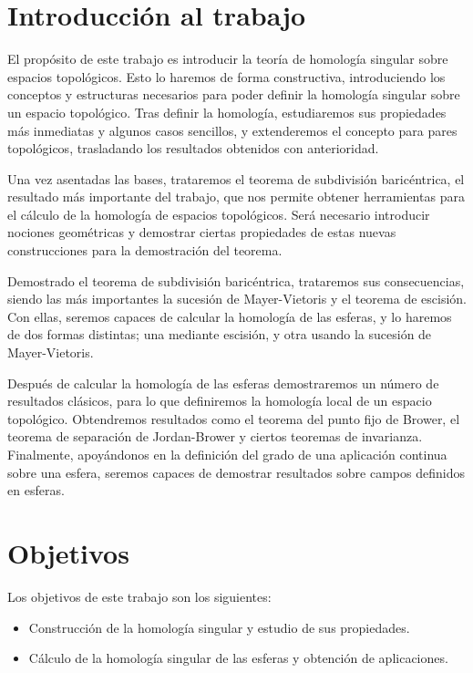 \label{ch:introduccionHOM}

\section{Introducción al trabajo}

El propósito de este trabajo es introducir la teoría de homología singular sobre
espacios topológicos. Esto lo haremos de forma constructiva, introduciendo los conceptos
y estructuras necesarios para poder definir la homología singular sobre un espacio topológico.
Tras definir la homología, estudiaremos sus propiedades más inmediatas y algunos casos sencillos,
y extenderemos el concepto para pares topológicos, trasladando los resultados obtenidos
con anterioridad.

Una vez asentadas las bases, trataremos el teorema de subdivisión baricéntrica, el
resultado más importante del trabajo, que nos permite obtener herramientas para el
cálculo de la homología de espacios topológicos. Será necesario introducir nociones
geométricas y demostrar ciertas propiedades de estas nuevas construcciones para la
demostración del teorema.

Demostrado el teorema de subdivisión baricéntrica, trataremos sus consecuencias,
siendo las más importantes la sucesión de Mayer-Vietoris y el teorema de escisión.
Con ellas, seremos capaces de calcular la homología de las esferas, y lo haremos
de dos formas distintas; una mediante escisión, y otra usando la sucesión de Mayer-Vietoris.

Después de calcular la homología de las esferas demostraremos un número de resultados clásicos,
para lo que definiremos la homología local de un espacio topológico. Obtendremos resultados
como el teorema del punto fijo de Brower, el teorema de separación de Jordan-Brower y
ciertos teoremas de invarianza. Finalmente, apoyándonos en la definición del grado de
una aplicación continua sobre una esfera, seremos capaces de demostrar resultados
sobre campos definidos en esferas.

\section{Objetivos}
Los objetivos de este trabajo son los siguientes:

\begin{itemize}
  \item Construcción de la homología singular y estudio de sus propiedades.

  \item Cálculo de la homología singular de las esferas y obtención de aplicaciones.

\end{itemize}


